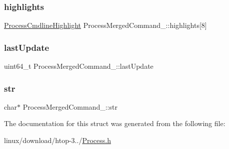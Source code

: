 \subsubsection{\texorpdfstring{highlights}{highlights}}
{\footnotesize\ttfamily \hyperlink{Process_8h_a29864e7758234311d4aa9e18e5f01610}{Process\+Cmdline\+Highlight} Process\+Merged\+Command\+\_\+\+::highlights\mbox{[}8\mbox{]}}

\mbox{\label{structProcessMergedCommand___a14b5113b8a21f20b4ad63fbc4b6a6166}} 
\subsubsection{\texorpdfstring{last\+Update}{lastUpdate}}
{\footnotesize\ttfamily uint64\+\_\+t Process\+Merged\+Command\+\_\+\+::last\+Update}

\mbox{\label{structProcessMergedCommand___ae63d5b8edbe9c73bb9404fccb1a04a9a}} 
\subsubsection{\texorpdfstring{str}{str}}
{\footnotesize\ttfamily char$\ast$ Process\+Merged\+Command\+\_\+\+::str}



The documentation for this struct was generated from the following file\+:\begin{DoxyCompactItemize}
\item 
linux/download/htop-\/3../\hyperlink{Process_8h}{Process.\+h}\end{DoxyCompactItemize}
